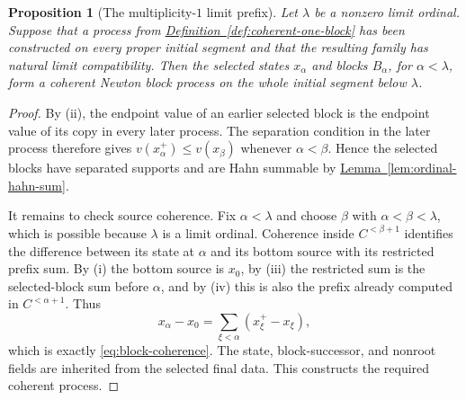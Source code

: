 \documentclass[11pt]{article}
\newcommand{\namedref}[2]{\hyperref[#2]{#1~\ref*{#2}}}
\theoremstyle{proofnote}
\newtheorem{proposition}[theorem]{Proposition}
\begin{document}
\begin{proposition}[The multiplicity-\(1\) limit prefix]
\label{prop:one-block-limit-prefix}
  Let \(\lambda\) be a nonzero limit ordinal.  Suppose that a process from
  \namedref{Definition}{def:coherent-one-block} has been constructed on every
  proper initial segment and that the resulting family has natural limit
  compatibility.  Then the selected states \(x_\alpha\) and blocks
  \(B_\alpha\), for \(\alpha<\lambda\), form a coherent Newton block process
  on the whole initial segment below \(\lambda\).
\end{proposition}
\begin{proof}
  By (ii), the endpoint value of an earlier selected block is the endpoint
  value of its copy in every later process.  The separation condition in the
  later process therefore gives
  \(v(x_\alpha^+)\le v(x_\beta)\) whenever
  \(\alpha<\beta\).  Hence the selected blocks have separated supports and
  are Hahn summable by \namedref{Lemma}{lem:ordinal-hahn-sum}.

  It remains to check source coherence.  Fix \(\alpha<\lambda\) and choose
  \(\beta\) with \(\alpha<\beta<\lambda\), which is possible because
  \(\lambda\) is a limit ordinal.  Coherence inside \(C^{<\beta+1}\) identifies
  the difference between its state at \(\alpha\) and its bottom source with
  its restricted prefix sum.  By (i) the bottom source is \(x_0\), by (iii)
  the restricted sum is the selected-block sum before \(\alpha\), and by
  (iv) this is also the prefix already computed in \(C^{<\alpha+1}\).  Thus
  \[
    x_\alpha-x_0=\sum_{\xi<\alpha}(x_\xi^+-x_\xi),
  \]
  which is exactly \eqref{eq:block-coherence}.  The state, block-successor,
  and nonroot fields are inherited from the selected final data.  This
  constructs the required coherent process.
\end{proof}
\end{document}
